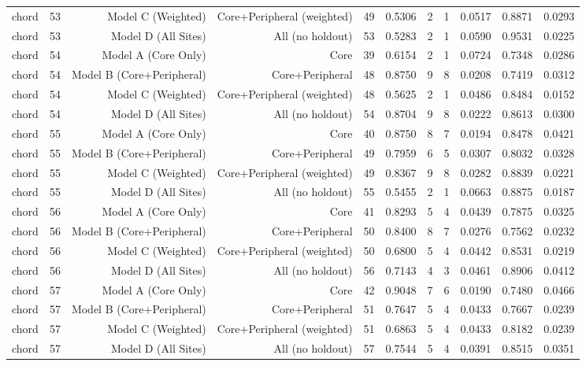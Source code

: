 {\begin{longtable}{lrrrrrrrrrr}
  chord & 53 & Model C (Weighted) & Core+Peripheral (weighted) & 49 & 0.5306 & 2 & 1 & 0.0517 & 0.8871 & 0.0293 \\
  chord & 53 & Model D (All Sites) & All (no holdout) & 53 & 0.5283 & 2 & 1 & 0.0590 & 0.9531 & 0.0225 \\
  chord & 54 & Model A (Core Only) & Core & 39 & 0.6154 & 2 & 1 & 0.0724 & 0.7348 & 0.0286 \\
  chord & 54 & Model B (Core+Peripheral) & Core+Peripheral & 48 & 0.8750 & 9 & 8 & 0.0208 & 0.7419 & 0.0312 \\
  chord & 54 & Model C (Weighted) & Core+Peripheral (weighted) & 48 & 0.5625 & 2 & 1 & 0.0486 & 0.8484 & 0.0152 \\
  chord & 54 & Model D (All Sites) & All (no holdout) & 54 & 0.8704 & 9 & 8 & 0.0222 & 0.8613 & 0.0300 \\
  chord & 55 & Model A (Core Only) & Core & 40 & 0.8750 & 8 & 7 & 0.0194 & 0.8478 & 0.0421 \\
  chord & 55 & Model B (Core+Peripheral) & Core+Peripheral & 49 & 0.7959 & 6 & 5 & 0.0307 & 0.8032 & 0.0328 \\
  chord & 55 & Model C (Weighted) & Core+Peripheral (weighted) & 49 & 0.8367 & 9 & 8 & 0.0282 & 0.8839 & 0.0221 \\
  chord & 55 & Model D (All Sites) & All (no holdout) & 55 & 0.5455 & 2 & 1 & 0.0663 & 0.8875 & 0.0187 \\
  chord & 56 & Model A (Core Only) & Core & 41 & 0.8293 & 5 & 4 & 0.0439 & 0.7875 & 0.0325 \\
  chord & 56 & Model B (Core+Peripheral) & Core+Peripheral & 50 & 0.8400 & 8 & 7 & 0.0276 & 0.7562 & 0.0232 \\
  chord & 56 & Model C (Weighted) & Core+Peripheral (weighted) & 50 & 0.6800 & 5 & 4 & 0.0442 & 0.8531 & 0.0219 \\
  chord & 56 & Model D (All Sites) & All (no holdout) & 56 & 0.7143 & 4 & 3 & 0.0461 & 0.8906 & 0.0412 \\
  chord & 57 & Model A (Core Only) & Core & 42 & 0.9048 & 7 & 6 & 0.0190 & 0.7480 & 0.0466 \\
  chord & 57 & Model B (Core+Peripheral) & Core+Peripheral & 51 & 0.7647 & 5 & 4 & 0.0433 & 0.7667 & 0.0239 \\
  chord & 57 & Model C (Weighted) & Core+Peripheral (weighted) & 51 & 0.6863 & 5 & 4 & 0.0433 & 0.8182 & 0.0239 \\
  chord & 57 & Model D (All Sites) & All (no holdout) & 57 & 0.7544 & 5 & 4 & 0.0391 & 0.8515 & 0.0351 \\

\end{longtable}}
